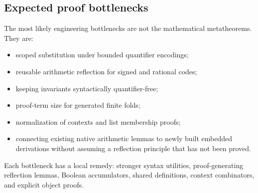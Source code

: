 \subsection{Expected proof bottlenecks}

The most likely engineering bottlenecks are not the mathematical metatheorems.  They are:

\begin{itemize}
\item scoped substitution under bounded quantifier encodings;
\item reusable arithmetic reflection for signed and rational codes;
\item keeping invariants syntactically quantifier-free;
\item proof-term size for generated finite folds;
\item normalization of contexts and list membership proofs;
\item connecting existing native arithmetic lemmas to newly built embedded derivations without assuming a reflection principle that has not been proved.
\end{itemize}

Each bottleneck has a local remedy: stronger syntax utilities, proof-generating reflection lemmas, Boolean accumulators, shared definitions, context combinators, and explicit object proofs.
